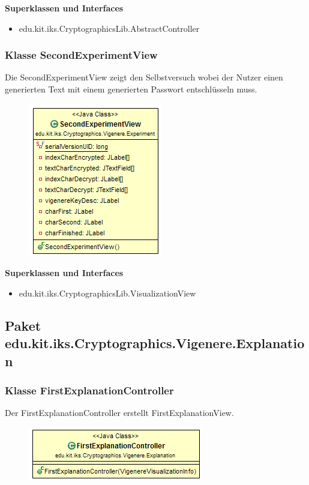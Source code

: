 \documentclass{article}
\begin{document}
      \textbf{Superklassen und Interfaces}
      \begin{itemize}
        \item edu.kit.iks.CryptographicsLib.AbstractController
      \end{itemize}

    \subsubsection{Klasse SecondExperimentView}
      Die SecondExperimentView zeigt den Selbstversuch wobei der Nutzer einen generierten Text mit einem generierten Passwort entschlüsseln muss.
      \begin{figure}[H]
        \centering
        \includegraphics{resources/edu-kit-iks-Cryptographics-Vigenere-SecondExperimentView}
      \end{figure}

      \textbf{Superklassen und Interfaces}
      \begin{itemize}
        \item edu.kit.iks.CryptographicsLib.VisualizationView
      \end{itemize}

  \subsection{Paket edu.kit.iks.Cryptographics.Vigenere.Explanation}
    \subsubsection{Klasse FirstExplanationController}
      Der FirstExplanationController erstellt FirstExplanationView.
      \begin{figure}[H]
        \centering
        \includegraphics{resources/edu-kit-iks-Cryptographics-Vigenere-FirstExplanationController}
      \end{figure}
\end{document}
